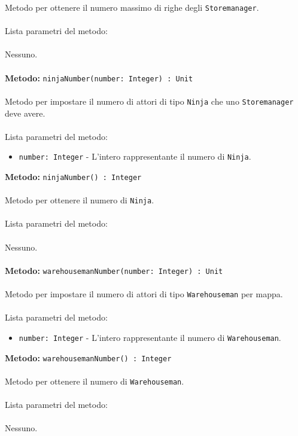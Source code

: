 \documentclass[a4paper]{article}
\begin{document}
		Metodo per ottenere il numero massimo di righe degli \texttt{Storemanager}.
		\\ \\
		Lista parametri del metodo:
		\\ \\
		Nessuno.
		\\ \\
		\textbf{Metodo:} \texttt{ninjaNumber(number: Integer) : Unit}
		\\ \\
		Metodo per impostare il numero di attori di tipo \texttt{Ninja} che uno \texttt{Storemanager} deve avere.
		\\ \\
		Lista parametri del metodo:
		\begin{itemize}
			\item \texttt{number: Integer} - L'intero rappresentante il numero di \texttt{Ninja}.
		\end{itemize}
		\textbf{Metodo:} \texttt{ninjaNumber() : Integer}
		\\ \\
		Metodo per ottenere il numero di \texttt{Ninja}.
		\\ \\
		Lista parametri del metodo:
		\\ \\
		Nessuno.
		\\ \\
		\textbf{Metodo:} \texttt{warehousemanNumber(number: Integer) : Unit}
		\\ \\
		Metodo per impostare il numero di attori di tipo \texttt{Warehouseman} per mappa.
		\\ \\
		Lista parametri del metodo:
		\begin{itemize}
			\item \texttt{number: Integer} - L'intero rappresentante il numero di \texttt{Warehouseman}.
		\end{itemize}
		\textbf{Metodo:} \texttt{warehousemanNumber() : Integer}
		\\ \\
		Metodo per ottenere il numero di \texttt{Warehouseman}.
		\\ \\
		Lista parametri del metodo:
		\\ \\
		Nessuno.
		\\ \\
			
\end{document}
